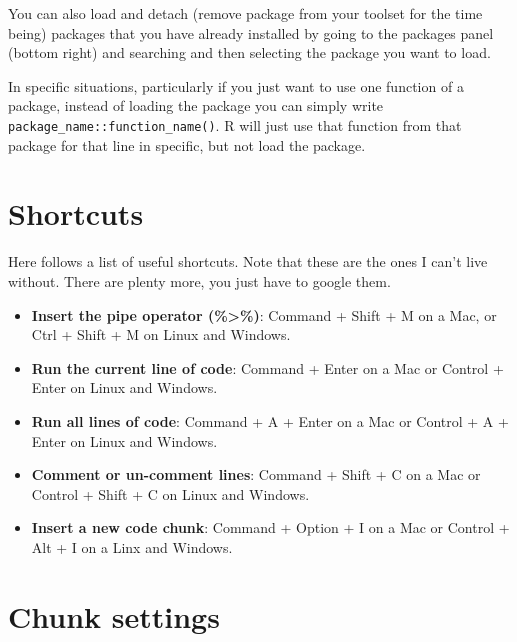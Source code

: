 \documentclass[
]{book}
\providecommand{\tightlist}{%
  \setlength{\itemsep}{0pt}\setlength{\parskip}{0pt}}
\begin{document}
You can also load and detach (remove package from your toolset for the time being) packages that you have already installed by going to the packages panel (bottom right) and searching and then selecting the package you want to load.

In specific situations, particularly if you just want to use one function of a package, instead of loading the package you can simply write \texttt{package\_name::function\_name()}.
R will just use that function from that package for that line in specific, but not load the package.

\hypertarget{shortcuts}{%
\section{Shortcuts}\label{shortcuts}}

Here follows a list of useful shortcuts.
Note that these are the ones I can't live without.
There are plenty more, you just have to google them.

\begin{itemize}
\tightlist
\item
  \textbf{Insert the pipe operator (\%\textgreater\%)}: Command + Shift + M on a Mac, or Ctrl + Shift + M on Linux and Windows.\\
\item
  \textbf{Run the current line of code}: Command + Enter on a Mac or Control + Enter on Linux and Windows.\\
\item
  \textbf{Run all lines of code}: Command + A + Enter on a Mac or Control + A + Enter on Linux and Windows.\\
\item
  \textbf{Comment or un-comment lines}: Command + Shift + C on a Mac or Control + Shift + C on Linux and Windows.\\
\item
  \textbf{Insert a new code chunk}: Command + Option + I on a Mac or Control + Alt + I on a Linx and Windows.\\
\end{itemize}

\hypertarget{chunk-settings}{%
\section{Chunk settings}\label{chunk-settings}}
\end{document}
